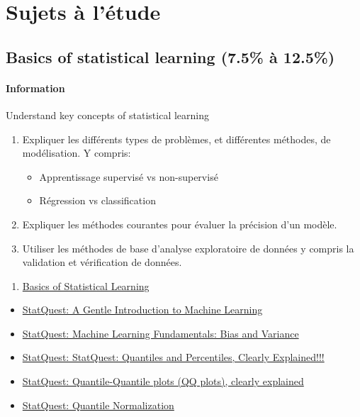 \documentclass[12pt, titlepage, french]{report}
\begin{document}
\part*{Sujets à l'étude}

\chapter[Basics of statistical learning]{Basics of statistical learning (7.5\% à 12.5\%)}

\subsection{Information}

\begin{distributions}[Objective]
Understand key concepts of statistical learning
\end{distributions}

\begin{outcomes}
\begin{enumerate}
	\item	Expliquer les différents types de problèmes, et différentes méthodes, de modélisation. Y compris: 
	\begin{itemize}
		\item	Apprentissage supervisé vs non-supervisé
		\item	Régression vs classification	
	\end{itemize}
	\item	Expliquer les méthodes courantes pour évaluer la précision d'un modèle.
	\item	Utiliser les méthodes de base d'analyse exploratoire de données y compris la validation et vérification de données.
\end{enumerate}
\end{outcomes}

\begin{ASM_chapter}
\begin{enumerate}
	\item	\hyperref[BASICS]{Basics of Statistical Learning}
\end{enumerate}
\end{ASM_chapter}

\begin{YTB_vids}
\begin{itemize}
	\item	\hyperref[SQ-BASICS-ML-INTRO]{StatQuest: A Gentle Introduction to Machine Learning}
	\item	\hyperref[SQ-BASICS-ML-BIASVARIANCE]{StatQuest: Machine Learning Fundamentals: Bias and Variance}
	\item	\hyperref[SQ-BASICS-QUANTILES]{StatQuest: StatQuest: Quantiles and Percentiles, Clearly Explained!!!}
	\item	\hyperref[SQ-BASICS-QQPLOTS]{StatQuest: Quantile-Quantile plots (QQ plots), clearly explained}
	\item	\hyperref[SQ-BASICS-QUANTILE-NORMALISATION]{StatQuest: Quantile Normalization}
\end{itemize}
\end{YTB_vids}
\end{document}
